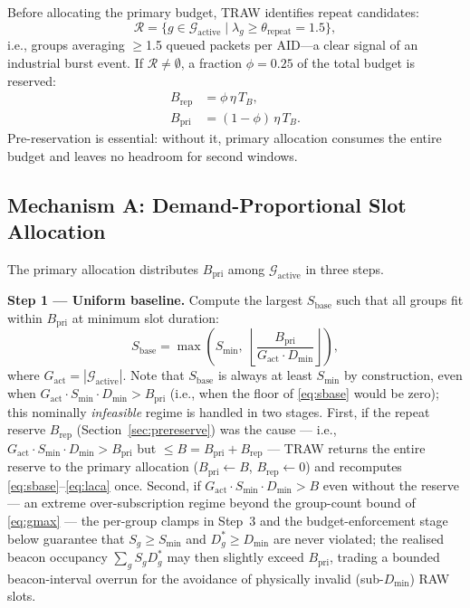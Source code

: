 \documentclass[journal]{IEEEtran}
\begin{document}
Before allocating the primary budget, TRAW identifies repeat
candidates:
\begin{equation}
  \mathcal{R} = \{g \in \mathcal{G}_\mathrm{active} \mid
    \lambda_g \geq \theta_\mathrm{repeat}\!=\!1.5\},
  \label{eq:rcand}
\end{equation}
i.e., groups averaging $\geq$1.5 queued packets per AID---a clear
signal of an industrial burst event.
If $\mathcal{R}\!\neq\!\emptyset$, a fraction $\phi\!=\!0.25$ of the
total budget is reserved:
\begin{align}
  B_\mathrm{rep} &= \phi\,\eta\,T_B, \label{eq:brep}\\
  B_\mathrm{pri} &= (1-\phi)\,\eta\,T_B. \label{eq:bpri}
\end{align}
Pre-reservation is essential: without it, primary allocation consumes
the entire budget and leaves no headroom for second windows.

\subsection{Mechanism A: Demand-Proportional Slot Allocation}
\label{sec:alloc}

The primary allocation distributes $B_\mathrm{pri}$ among
$\mathcal{G}_\mathrm{active}$ in three steps.

\textbf{Step 1 --- Uniform baseline.}
Compute the largest $S_\mathrm{base}$ such that all groups fit within
$B_\mathrm{pri}$ at minimum slot duration:
\begin{equation}
  S_\mathrm{base} = \max\!\left(S_\mathrm{min},\;
    \left\lfloor\frac{B_\mathrm{pri}}{G_\mathrm{act}\cdot D_\mathrm{min}}
    \right\rfloor\right),
  \label{eq:sbase}
\end{equation}
where $G_\mathrm{act}\!=\!|\mathcal{G}_\mathrm{active}|$.
Note that $S_\mathrm{base}$ is always at least $S_\mathrm{min}$ by
construction, even when $G_\mathrm{act}\cdot S_\mathrm{min}\cdot
D_\mathrm{min} > B_\mathrm{pri}$ (i.e., when the floor of
\eqref{eq:sbase} would be zero); this nominally
\emph{infeasible} regime is handled in two stages.
First, if the repeat reserve $B_\mathrm{rep}$
(Section~\ref{sec:prereserve}) was the cause --- i.e., $G_\mathrm{act}\cdot
S_\mathrm{min}\cdot D_\mathrm{min} > B_\mathrm{pri}$ but $\leq
B\!=\!B_\mathrm{pri}\!+\!B_\mathrm{rep}$ --- TRAW returns the entire
reserve to the primary allocation ($B_\mathrm{pri}\!\leftarrow\!B$,
$B_\mathrm{rep}\!\leftarrow\!0$) and recomputes
\eqref{eq:sbase}--\eqref{eq:laca} once.
Second, if $G_\mathrm{act}\cdot S_\mathrm{min}\cdot D_\mathrm{min} > B$
even without the reserve --- an extreme over-subscription regime
beyond the group-count bound of \eqref{eq:gmax} --- the per-group
clamps in Step~3 and the budget-enforcement stage below guarantee that
$S_g\!\geq\!S_\mathrm{min}$ and $D_g^*\!\geq\!D_\mathrm{min}$ are never
violated; the realised beacon occupancy $\sum_g S_g D_g^*$ may then
slightly exceed $B_\mathrm{pri}$, trading a bounded beacon-interval
overrun for the avoidance of physically invalid (sub-$D_\mathrm{min}$)
RAW slots.
\end{document}
